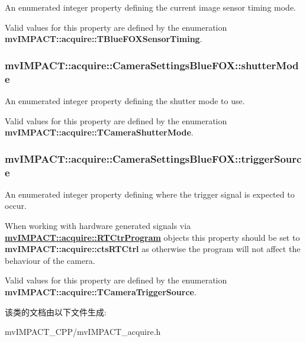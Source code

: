 An enumerated integer property defining the current image sensor timing mode. 

Valid values for this property are defined by the enumeration {\bfseries mv\+I\+M\+P\+A\+C\+T\+::acquire\+::\+T\+Blue\+F\+O\+X\+Sensor\+Timing}. \hypertarget{classmv_i_m_p_a_c_t_1_1acquire_1_1_camera_settings_blue_f_o_x_a3cd4e31b70fbc2c296fc2532202c7b49}{
\subsubsection[{shutter\+Mode}]{ mv\+I\+M\+P\+A\+C\+T\+::acquire\+::\+Camera\+Settings\+Blue\+F\+O\+X\+::shutter\+Mode}}\label{classmv_i_m_p_a_c_t_1_1acquire_1_1_camera_settings_blue_f_o_x_a3cd4e31b70fbc2c296fc2532202c7b49}


An enumerated integer property defining the shutter mode to use. 

Valid values for this property are defined by the enumeration {\bfseries mv\+I\+M\+P\+A\+C\+T\+::acquire\+::\+T\+Camera\+Shutter\+Mode}. \hypertarget{classmv_i_m_p_a_c_t_1_1acquire_1_1_camera_settings_blue_f_o_x_ad9f52f05612fa050ca3ae507e340d8d9}{
\subsubsection[{trigger\+Source}]{ mv\+I\+M\+P\+A\+C\+T\+::acquire\+::\+Camera\+Settings\+Blue\+F\+O\+X\+::trigger\+Source}}\label{classmv_i_m_p_a_c_t_1_1acquire_1_1_camera_settings_blue_f_o_x_ad9f52f05612fa050ca3ae507e340d8d9}


An enumerated integer property defining where the trigger signal is expected to occur. 

When working with hardware generated signals via {\bfseries \hyperlink{classmv_i_m_p_a_c_t_1_1acquire_1_1_r_t_ctr_program}{mv\+I\+M\+P\+A\+C\+T\+::acquire\+::\+R\+T\+Ctr\+Program}} objects this property should be set to {\bfseries mv\+I\+M\+P\+A\+C\+T\+::acquire\+::cts\+R\+T\+Ctrl} as otherwise the program will not affect the behaviour of the camera.

Valid values for this property are defined by the enumeration {\bfseries mv\+I\+M\+P\+A\+C\+T\+::acquire\+::\+T\+Camera\+Trigger\+Source}. 

该类的文档由以下文件生成\+:\begin{DoxyCompactItemize}
\item 
mv\+I\+M\+P\+A\+C\+T\+\_\+\+C\+P\+P/mv\+I\+M\+P\+A\+C\+T\+\_\+acquire.\+h\end{DoxyCompactItemize}
